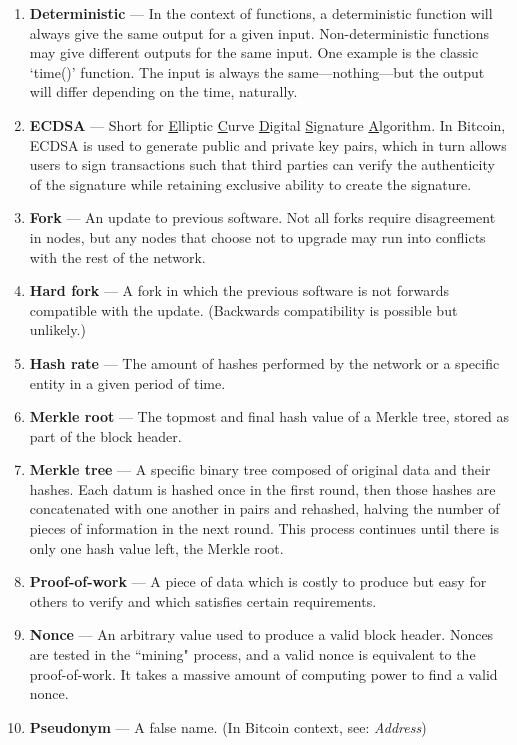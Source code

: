 \documentclass[11pt]{article}
\begin{document}
\begin{enumerate}
        \item \textbf{Deterministic} --- In the context of functions, a deterministic function will always give the same output for a given input. Non-deterministic functions may give different outputs for the same input. One example is the classic `time()' function. The input is always the same---nothing---but the output will differ depending on the time, naturally.
        \item \textbf{ECDSA} --- Short for \underline{E}lliptic \underline{C}urve \underline{D}igital \underline{S}ignature \underline{A}lgorithm. In Bitcoin, ECDSA is used to generate public and private key pairs, which in turn allows users to sign transactions such that third parties can verify the authenticity of the signature while retaining exclusive ability to create the signature.
        \newpage
        \item \textbf{Fork} --- An update to previous software. Not all forks require disagreement in nodes, but any nodes that choose not to upgrade may run into conflicts with the rest of the network.
        \item \textbf{Hard fork} --- A fork in which the previous software is not forwards compatible with the update. (Backwards compatibility is possible but unlikely.)
        \item \textbf{Hash rate} --- The amount of hashes performed by the network or a specific entity in a given period of time.
        \item \textbf{Merkle root} --- The topmost and final hash value of a Merkle tree, stored as part of the block header.
        \item \textbf{Merkle tree} --- A specific binary tree composed of original data and their hashes. Each datum is hashed once in the first round, then those hashes are concatenated with one another in pairs and rehashed, halving the number of pieces of information in the next round. This process continues until there is only one hash value left, the Merkle root.
        \item \textbf{Proof-of-work} --- A piece of data which is costly to produce but easy for others to verify and which satisfies certain requirements.
        \item \textbf{Nonce} --- An arbitrary value used to produce a valid block header. Nonces are tested in the ``mining" process, and a valid nonce is equivalent to the proof-of-work. It takes a massive amount of computing power to find a valid nonce.
        \item \textbf{Pseudonym} --- A false name. (In Bitcoin context, see: \textit{Address})

\end{enumerate}
\end{document}
